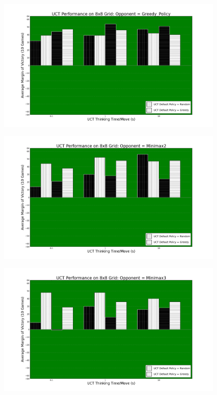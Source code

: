 \documentclass[12pt,letterpaper]{article}
\begin{document}
\begin{figure}[!hp]
\begin{center}
\includegraphics[scale=.4]{88_Greedy_Policy}
\end{center}
\end{figure}

\begin{figure}[!hp]
\begin{center}
\includegraphics[scale=.4]{88_Minimax2}
\end{center}
\end{figure}

\begin{figure}[!hp]
\begin{center}
\includegraphics[scale=.4]{88_Minimax3}
\end{center}
\end{figure}
\end{document}
